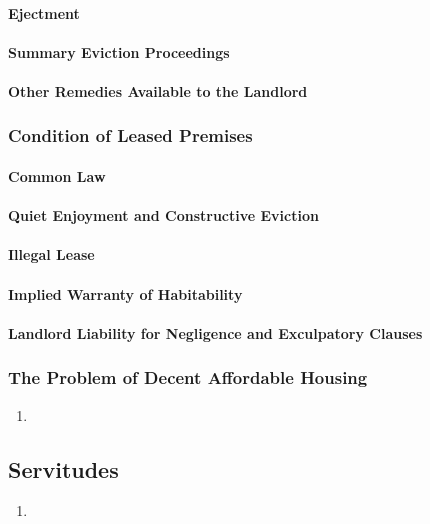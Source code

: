 \paragraph{Ejectment} %
\paragraph{Summary Eviction Proceedings} %
\paragraph{Other Remedies Available to the Landlord} %

\subsubsection{Condition of Leased Premises} %

\paragraph{Common Law}
\paragraph{Quiet Enjoyment and Constructive Eviction} %
\paragraph{Illegal Lease} %
\paragraph{Implied Warranty of Habitability} %
\paragraph{Landlord Liability for Negligence and Exculpatory Clauses}

\subsubsection{The Problem of Decent Affordable Housing} %

\begin{enumerate}
    \item %
\end{enumerate}

\subsection{Servitudes}

\begin{enumerate}
    \item %
\end{enumerate}
